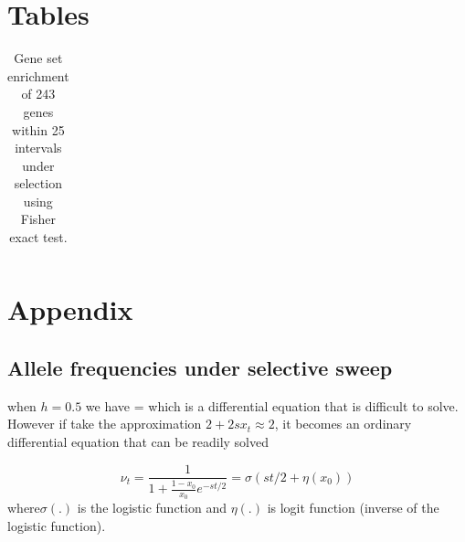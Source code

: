 \documentclass[11pt]{article}
\begin{document}
\clearpage
\newpage

\section*{Tables}
\begin{table}[H]
	\begin{tabular}{c}
		
	\end{tabular}
	\caption{Gene set enrichment of 243 genes within 25 intervals under 
          selection using Fisher exact test.}\label{tab:Fisher}
\end{table}
\clearpage
\newpage





\clearpage
\setcounter{figure}{0}
\setcounter{table}{0}
\setcounter{equation}{0}
\renewcommand{\thefigure}{S\arabic{figure}}
\renewcommand{\thetable}{S\arabic{table}}
\renewcommand{\theequation}{S\arabic{equation}}

\section{Appendix}
\subsection{Allele frequencies under selective sweep} \label{app:af}
when $h=0.5$ we have
\beq
{} = 
\eeq
which is a differential equation that is difficult to solve. However if take 
the approximation $2+2sx_t \approx 2$, it becomes an ordinary differential 
equation that can be readily solved

\begin{equation}
\nu_t =\frac{1}{1+\frac{1-x_0}{x_0}e^{-st/2}} = \sigma(st/2+\eta(x_0)) 
\label{eq:inf-pop}
\end{equation}
where$\sigma(.)$ is the logistic
function and $\eta(.)$ is logit function (inverse of the logistic function). 
\end{document}
